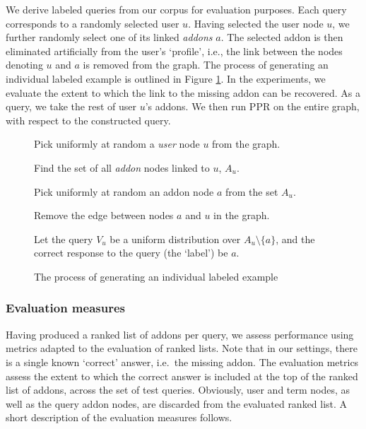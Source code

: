 \documentclass[ijoc,nonblindrev]{informs3} %
\numberwithin{equation}{subsection}
\begin{document}
We derive labeled queries from our corpus for evaluation purposes.  Each query corresponds to a randomly selected user $u$. Having selected the user node $u$, we further randomly select one of its linked {\it addons} $a$. The selected addon is then eliminated artificially from the user's `profile', i.e., the link between the nodes denoting $u$ and $a$ is removed from the graph. The process of generating an individual labeled example is outlined in Figure \ref{fig:example-gen}. In the experiments, we evaluate the extent to which the link to the missing addon can be recovered. As a query, we take the rest of user $u$'s addons. We then run PPR on the entire graph, with respect to the constructed query. 

\begin{figure}
\begin{enumerate}[(a)]
\begin{small}
\item Pick uniformly at random a {\it user} node $u$ from the graph.
\item Find the set of all {\it addon} nodes linked to $u$, $A_u$.
\item Pick uniformly at random an addon node $a$ from the set $A_u$. 
\item Remove the edge between nodes $a$ and $u$ in the
  graph. 
\item Let the query $V_u$ be a uniform distribution over $A_u \setminus \{a\}$,
  and the correct response to the query (the `label') be $a$. 
\end{small}
\end{enumerate}
\caption{The process of generating an individual labeled example}
\label{fig:example-gen}
\end{figure}

\subsubsection{Evaluation measures}

Having produced a ranked list of addons per query, we assess performance using metrics adapted to the evaluation of ranked lists. Note that in our settings, there is a single known `correct' answer, i.e.~the missing addon. The evaluation metrics assess the extent to which the correct answer is included at the top of the ranked list of addons, across the set of test queries. Obviously, user and term nodes, as well as the query addon nodes, are discarded from the evaluated ranked list. A short description of the evaluation measures follows.
\end{document}

